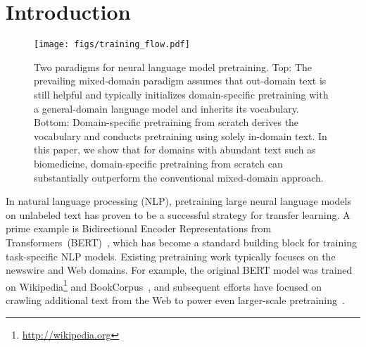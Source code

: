 \documentclass[acmlarge,screen,nonacm]{acmart}
\begin{document}
 








\maketitle

\section{Introduction}
\label{sec:intro}

\begin{figure}
    \centering
    \texttt{[image: figs/training\_flow.pdf]}
    \caption{Two paradigms for neural language model pretraining. Top: The prevailing mixed-domain paradigm assumes that out-domain text is still helpful and typically initializes domain-specific pretraining with a general-domain language model and inherits its vocabulary. Bottom: Domain-specific pretraining from scratch derives the vocabulary and conducts pretraining using solely in-domain text. In this paper, we show that for domains with abundant text such as biomedicine, domain-specific pretraining from scratch can substantially outperform the conventional mixed-domain approach.
}
    \label{fig:training_flow}
\end{figure}



In natural language processing (NLP), pretraining large neural language models on unlabeled text has proven to be a successful strategy for transfer learning. A prime example is Bidirectional Encoder Representations from Transformers~(BERT)~\cite{devlin2018bert}, which has become a standard building block for training task-specific NLP models.
Existing pretraining work typically focuses on the newswire and Web domains. For example, the original BERT model was trained on Wikipedia\footnote{\url{http://wikipedia.org}} and BookCorpus~\cite{zhu&al15_books}, and subsequent efforts have focused on crawling additional text from the Web to power even larger-scale pretraining~\cite{liu2019roberta,raffel2019t5}.
\end{document}
